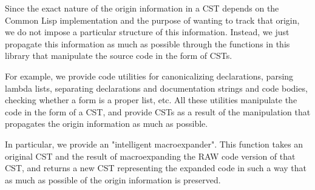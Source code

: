 Since the exact nature of the origin information in a CST depends on
the Common Lisp implementation and the purpose of wanting to track
that origin, we do not impose a particular structure of this
information.  Instead, we just propagate this information as much as
possible through the functions in this library that manipulate the
source code in the form of CSTs.

For example, we provide code utilities for canonicalizing
declarations, parsing lambda lists, separating declarations and
documentation strings and code bodies, checking whether a form is a
proper list, etc.  All these utilities manipulate the code in the form
of a CST, and provide CSTs as a result of the manipulation that
propagates the origin information as much as possible.

In particular, we provide an "intelligent macroexpander".  This
function takes an original CST and the result of macroexpanding the
RAW code version of that CST, and returns a new CST representing the
expanded code in such a way that as much as possible of the origin
information is preserved.
